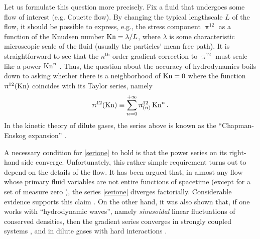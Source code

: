 \documentclass[a4paper, amsfonts, amssymb, amsmath, reprint, showkeys, nofootinbib, twoside, onecolumn,notitlepage]{revtex4-2}
\theoremstyle{definition}
\theoremstyle{theorem}
\newcommand{\Kn}{\textup{Kn}}
\theoremstyle{corollary}
\begin{document}
Let us formulate this question more precisely. Fix a fluid that undergoes some flow of interest (e.g. Couette flow). By changing the typical lengthscale $L$ of the flow, it should be possible to express, e.g., the stress component $\uppi^{12}$ as a function of the Knudsen number $\Kn=\lambda/L$, where $\lambda$ is some characteristic microscopic scale of the fluid (usually the particles' mean free path). It is straightforward to see that the $n^{\text{th}}$-order gradient correction to $\uppi^{12}$ must scale like a power $\Kn^n$ \cite{huang_book}. Thus, the question about the accuracy of hydrodynamics boils down to asking whether there is a neighborhood of $\Kn=0$ where the function $\uppi^{12}(\Kn)$ coincides with its Taylor series, namely \cite{Struchtrup2011}
\begin{equation}\label{serione}
\uppi^{12}(\Kn) \equiv \sum_{n=0}^{+\infty} \uppi^{12}_{(n)} \, \Kn^n \, .
\end{equation}
In the kinetic theory of dilute gases, the series above is known as the ``Chapman-Enskog expansion'' \cite{Groot1980RelativisticKT,cercignani_book,Santos1986}. 

A necessary condition for \eqref{serione} to hold is that the power series on its right-hand side converge. Unfortunately, this rather simple requirement turns out to depend on the details of the flow. It has been argued \cite{Santos1986,Romatschke2017} that, in almost any flow whose primary fluid variables are not entire functions of spacetime (except for a set of measure zero \cite{DenicolNoronhaExactHardSphereses}), the series \eqref{serione} diverges factorially. Considerable evidence supports this claim \cite{HellerAttractors2015,HellerBeyondBjorken2022,HellerSingulant2022,GavassinoInfiniteOrder2024pgl}. On the other hand, it was also shown that, if one works with ``hydrodynamic waves'', namely \textit{sinusoidal} linear fluctuations of conserved densities, then the gradient series converges in strongly coupled systems \cite{GrozdanovGradient2019kge}, and in dilute gases with hard interactions \cite{McLennan1965,Dudynski1989}. 
\end{document}
